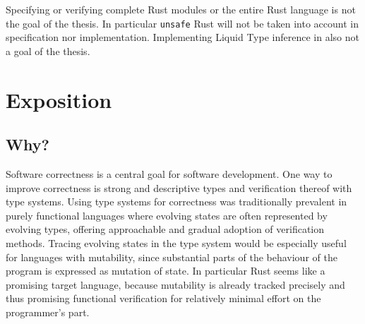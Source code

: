 \documentclass[11pt]{article}
\newcommand{\code}[1]{\texttt{#1}}
\begin{document}
Specifying or verifying complete Rust modules or the entire Rust language is not the goal of the thesis. In particular \code{unsafe} Rust will not be taken into account in specification nor implementation. Implementing Liquid Type inference in also not a goal of the thesis.


\section{Exposition}

\subsection{Why?}


Software correctness is a central goal for software development. One way to improve correctness is strong and descriptive types and verification thereof with type systems. Using type systems for correctness was traditionally prevalent in purely functional languages where evolving states are often represented by evolving types, offering approachable and gradual adoption of verification methods. Tracing evolving states in the type system would be especially useful for languages with mutability, since substantial parts of the behaviour of the program is expressed as mutation of state. In particular Rust seems like a promising target language, because mutability is already tracked precisely and thus promising functional verification for relatively minimal effort on the programmer's part.






\end{document}
